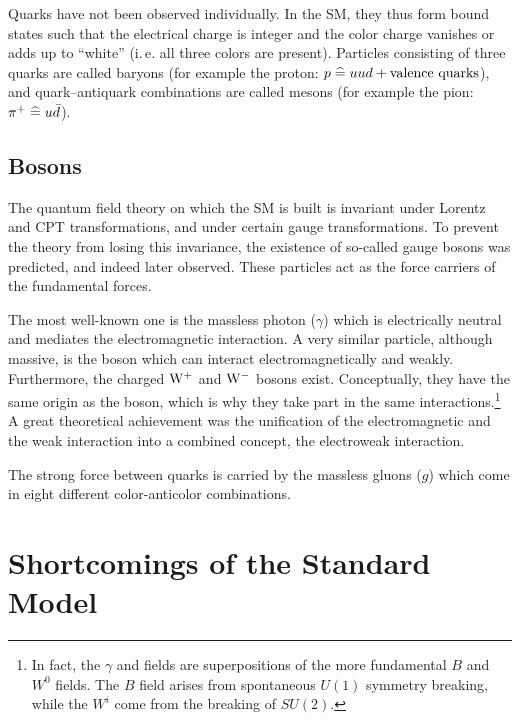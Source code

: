 Quarks have not been observed individually. In the SM, they thus form bound states such that the electrical charge is integer and the color charge vanishes or adds up to ``white'' (i.\,e. all three colors are present). Particles consisting of three quarks are called baryons (for example the proton: $p \mathrel{\widehat{=}} uud + \textrm{valence quarks}$), and quark--antiquark combinations are called mesons (for example the pion: $\pi^+ \mathrel{\widehat{=}} u \bar d$).

\subsection{Bosons}
The quantum field theory on which the SM is built is invariant under Lorentz and CPT transformations, and under certain gauge transformations. To prevent the theory from losing this invariance, the existence of so-called gauge bosons was predicted, and indeed later observed. These particles act as the force carriers of the fundamental forces.

The most well-known one is the massless photon ($\gamma$) which is electrically neutral and mediates the electromagnetic interaction. A very similar particle, although massive, is the \Z boson which can interact electromagnetically and weakly. Furthermore, the charged $\mathrm{W}^+$ and $\mathrm{W}^-$ bosons exist. Conceptually, they have the same origin as the \Z boson, which is why they take part in the same interactions.\footnote{In fact, the $\gamma$ and \Z fields are superpositions of the more fundamental $B$ and $W^0$ fields. The $B$ field arises from spontaneous $U(1)$ symmetry breaking, while the $W^i$ come from the breaking of $SU(2)$.} A great theoretical achievement was the unification of the electromagnetic and the weak interaction into a combined concept, the electroweak interaction.

The strong force between quarks is carried by the massless gluons ($g$) which come in eight different color-anticolor combinations.

\section{Shortcomings of the Standard Model}
\label{sec:Theory/Shortcomings}

